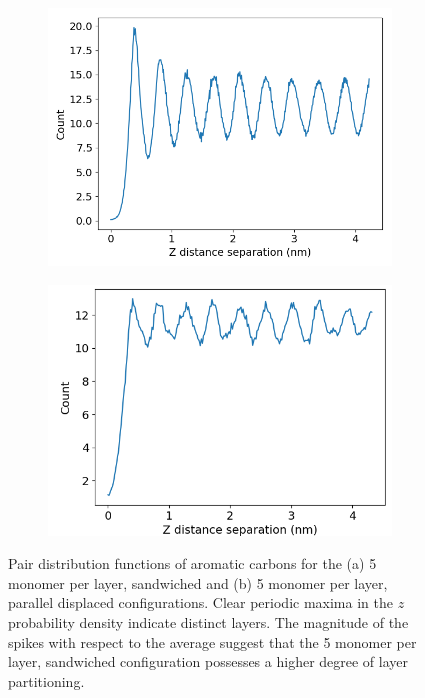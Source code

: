 \documentclass{article}
\begin{document}
  \begin{figure}
        \centering
        \begin{subfigure}{0.45\textwidth}
                \centering
                \includegraphics[width=\textwidth]{zdf5layered.png}
                \caption{}\label{fig:zdf_layered}
        \end{subfigure}
        \begin{subfigure}{0.45\textwidth}
                \centering
                \includegraphics[width=\textwidth]{zdf5offset.png}
                \caption{}\label{fig:zdf_offset}
        \end{subfigure}
        \caption{Pair distribution functions of aromatic carbons for the
        (a) 5 monomer per layer, sandwiched and (b) 5 monomer per layer,
        parallel displaced configurations. Clear periodic maxima in the
        $z$ probability density indicate distinct layers. The magnitude
        of the spikes with respect to the average suggest that the 5
        monomer per layer, sandwiched configuration possesses a higher
        degree of layer partitioning.}\label{fig:zdf}
  \end{figure}
\end{document}
